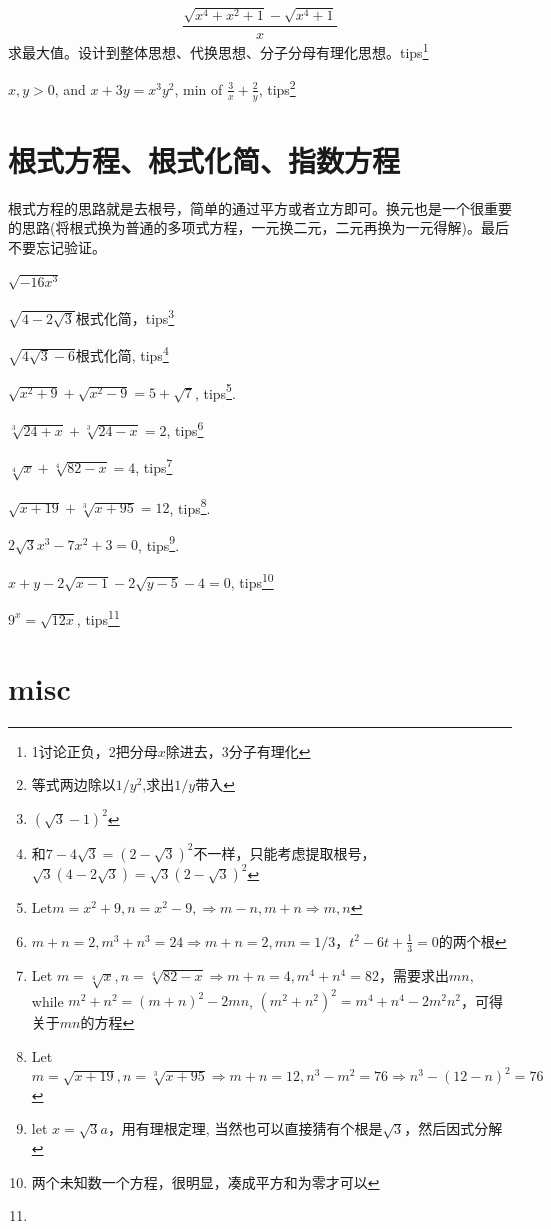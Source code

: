\documentclass[algebra.tex]{subfiles}
\begin{document}
\[\frac{\sqrt{x^{4}+x^{2}+1} - \sqrt{x^{4}+1}}{x}\]求最大值。设计到整体思想、代换思想、分子分母有理化思想。tips\footnote{1讨论正负，2把分母$x$除进去，3分子有理化}

\hrulefill

$x,y > 0$, and $x+3y=x^{3}y^{2}$, min of $\frac{3}{x} + \frac{2}{y}$, tips\footnote{等式两边除以$1/y^2$,求出$1/y$带入}

\hrulefill

\clearpage
\section{根式方程、根式化简、指数方程}
根式方程的思路就是去根号，简单的通过平方或者立方即可。换元也是一个很重要的思路(将根式换为普通的多项式方程，一元换二元，二元再换为一元得解)。最后不要忘记验证。

$\sqrt{-16x^3}$

$\sqrt{4-2\sqrt{3}}$根式化简，tips\footnote{$(\sqrt{3}-1)^2$}

$\sqrt{4\sqrt{3}-6}$根式化简, tips\footnote{和$7-4\sqrt{3}=(2-\sqrt{3})^2$不一样，只能考虑提取根号，$\sqrt{3}(4-2\sqrt{3})=\sqrt{3}(2-\sqrt{3})^2$}

$\sqrt{x^2+9}+\sqrt{x^2-9}=5+\sqrt{7}$, tips\footnote{Let$m=x^2+9, n=x^2-9, \Rightarrow m-n, m+n \Rightarrow m,n$}.

$\sqrt[3]{24+x} + \sqrt[3]{24-x}=2$, tips\footnote{$m+n=2, m^3+n^3=24 \Rightarrow m+n=2, mn=1/3$，$t^2-6t+\frac{1}{3}=0$的两个根}

$\sqrt[4]{x} + \sqrt[4]{82-x}=4$, tips\footnote{Let $m=\sqrt[4]{x}, n=\sqrt[4]{82-x} \Rightarrow m+n=4, m^4+n^4=82$，需要求出$mn$,\\
  while $m^2+n^2=(m+n)^2-2mn$, $(m^2+n^2)^2=m^4+n^4-2m^2n^2$，可得关于$mn$的方程}

$\sqrt{x+19} + \sqrt[3]{x+95}=12$, tips\footnote{Let $m=\sqrt{x+19}, n=\sqrt[3]{x+95} \Rightarrow m+n=12, n^3-m^2=76 \Rightarrow n^3-(12-n)^2=76$}.

$2\sqrt{3}x^3-7x^2+3=0$, tips\footnote{let $x=\sqrt{3}a$，用有理根定理, 当然也可以直接猜有个根是$\sqrt{3}$，然后因式分解}.

$x+y-2\sqrt{x-1}-2\sqrt{y-5}-4=0$, tips\footnote{两个未知数一个方程，很明显，凑成平方和为零才可以}

$9^x=\sqrt{12x}$, tips\footnote{}

\section{misc}
\end{document}
